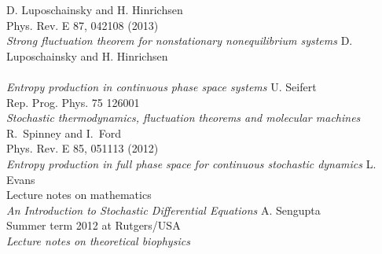 \begin{thebibliography}{99}
	 {
		D. Luposchainsky and H. Hinrichsen \\
		Phys. Rev. E 87, 042108 (2013) \\
		\emph{Strong fluctuation theorem for nonstationary nonequilibrium systems}
		}
	 {
		D. Luposchainsky and H. Hinrichsen \\
		 \\
		\emph{Entropy production in continuous phase space systems}
		}
	 {
		U. Seifert \\
		Rep. Prog. Phys. 75 126001 \\
		\emph{Stochastic thermodynamics, fluctuation theorems and molecular machines}
		}
	 {
		R.~Spinney and I.~Ford \\
		Phys. Rev. E 85, 051113 (2012) \\
		\emph{Entropy production in full phase space for continuous stochastic dynamics}
		}
	 {
		L. Evans \\
		Lecture notes on mathematics \\
		\emph{An Introduction to Stochastic Differential Equations}
		}
	 {
		A. Sengupta \\
		Summer term 2012 at Rutgers/USA \\
		\emph{Lecture notes on theoretical biophysics}
		}

		
\end{thebibliography}

